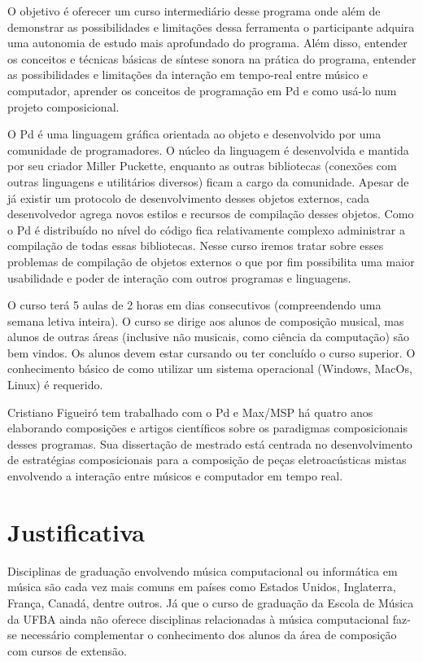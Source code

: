 \documentclass{article}
\begin{document}
 O objetivo é oferecer um curso intermediário desse programa onde além de
demonstrar as possibilidades e limitações dessa ferramenta o participante adquira uma
autonomia de estudo mais aprofundado do programa. Além disso, entender os conceitos e
técnicas básicas de síntese sonora na prática do programa, entender as possibilidades e
limitações da interação em tempo-real entre músico e computador, aprender os conceitos
de programação em Pd e como usá-lo num projeto composicional.

O Pd é uma linguagem gráfica orientada ao objeto e desenvolvido por uma comunidade de programadores.
O núcleo da linguagem é desenvolvida e mantida por seu criador Miller Puckette, enquanto as outras bibliotecas (conexões com outras linguagens e utilitários diversos) ficam a cargo da comunidade. Apesar de já existir um protocolo de desenvolvimento desses objetos externos, cada desenvolvedor agrega novos estilos e recursos
 de compilação desses objetos. Como o Pd é distribuído no nível do código fica relativamente complexo administrar a compilação de todas essas bibliotecas. Nesse curso iremos tratar sobre esses problemas de compilação de objetos externos o que por fim possibilita uma maior usabilidade e poder de interação com outros programas e linguagens.
      

 O curso terá 5 aulas de 2 horas em dias consecutivos (compreendendo uma semana
letiva inteira). O curso se dirige aos alunos de composição musical, mas alunos de outras
áreas (inclusive não musicais, como ciência da computação) são bem vindos. Os alunos
devem estar cursando ou ter concluído o curso superior. O conhecimento básico de como
utilizar um sistema operacional (Windows, MacOs, Linux) é requerido.
      

 Cristiano Figueiró tem trabalhado com o Pd e Max/MSP há quatro anos
elaborando composições e artigos científicos sobre os paradigmas composicionais desses
programas. Sua dissertação de mestrado está centrada no desenvolvimento de estratégias
composicionais para a composição de peças eletroacústicas mistas envolvendo a
interação entre músicos e computador em tempo real.


\section{Justificativa}
\label{sec:justificativa}
           Disciplinas de graduação envolvendo música computacional ou informática em
música são cada vez mais comuns em países como Estados Unidos, Inglaterra, França,
Canadá, dentre outros. Já que o curso de graduação da Escola de Música da UFBA ainda
não oferece disciplinas relacionadas à música computacional faz-se necessário
complementar o conhecimento dos alunos da área de composição com cursos de extensão.
	
\end{document}
